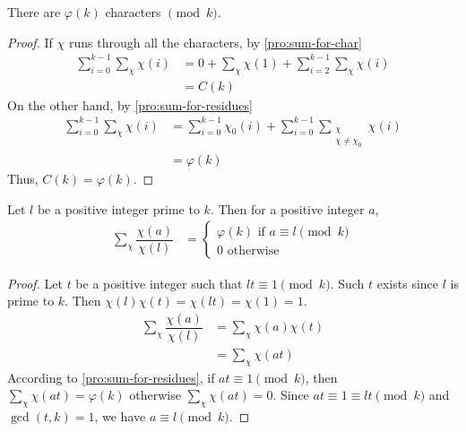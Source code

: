 \documentclass[elemannt.tex]{subfile}
\begin{document}
		\begin{proposition}
			There are $\varphi(k)$ characters $\pmod{k}$.
		\end{proposition}

		\begin{proof}
			If $\chi$ runs through all the characters, by \autoref{pro:sum-for-char}
				\begin{align*}
					\sum_{i=0}^{k-1}\sum_{\chi}\chi(i)
						& = 0+\sum_{\chi}\chi(1)+\sum_{i=2}^{k-1}\sum_{\chi}\chi(i)\\
						& = C(k)
				\end{align*}
			On the other hand, by \autoref{pro:sum-for-residues}
				\begin{align*}
					\sum_{i=0}^{k-1}\sum_{\chi}\chi(i)
						& = \sum_{i=0}^{k-1}\chi_{0}(i)+\sum_{i=0}^{k-1}\sum_{\substack{\chi\\\chi\neq\chi_{0}}}\chi(i)\\
						& = \varphi(k)
				\end{align*}
			Thus, $C(k)=\varphi(k)$.
		\end{proof}

		\begin{proposition}
			Let $l$ be a positive integer prime to $k$. Then for a positive integer $a$,
				\begin{align*}
					\sum_{\chi}\dfrac{\chi(a)}{\chi(l)}
						& =
							\begin{cases}
								\varphi(k)\mbox{ if }a\equiv l\pmod{k}\\
								0\mbox{ otherwise}
							\end{cases}
				\end{align*}
		\end{proposition}

		\begin{proof}
			Let $t$ be a positive integer such that $lt\equiv1\pmod{k}$. Such $t$ exists since $l$ is prime to $k$. Then $\chi(l)\chi(t)=\chi(lt)=\chi(1)=1$.
				\begin{align*}
					\sum_{\chi}\dfrac{\chi(a)}{\chi(l)}
						& = \sum_{\chi}\chi(a)\chi(t)\\
						& = \sum_{\chi}\chi(at)
				\end{align*}
			According to \autoref{pro:sum-for-residues}, if $at\equiv1\pmod{k}$, then $\sum_{\chi}\chi(at)=\varphi(k)$ otherwise $\sum_{\chi}\chi(at)=0$. Since $at\equiv1\equiv lt\pmod{k}$ and $\gcd(t,k)=1$, we have $a\equiv l\pmod{k}$.
		\end{proof}
\end{document}
